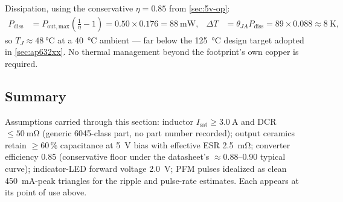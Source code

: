 Dissipation, using the conservative $\eta = 0.85$ from \cref{sec:5v-op}:
\begin{align*}
  P_{\mathrm{diss}} &= P_{\mathrm{out,max}}\left(\frac{1}{\eta}-1\right)
    = 0.50 \times 0.176 = \SI{88}{\milli\watt}, &
  \Delta T &= \theta_{JA} P_{\mathrm{diss}} = 89 \times 0.088 \approx \SI{8}{\kelvin},
\end{align*}
so $T_J \approx \SI{48}{\celsius}$ at a \SI{40}{\celsius} ambient --- far below the
\SI{125}{\celsius} design target adopted in \cref{sec:ap632xx}. No thermal management
beyond the footprint's own copper is required.

\subsection{Summary}\label{sec:5v-summary}

Assumptions carried through this section: inductor $I_{\mathrm{sat}} \geq \SI{3.0}{\ampere}$
and DCR $\leq \SI{50}{\milli\ohm}$ (generic 6045-class part, no part number recorded);
output ceramics retain $\geq 60\,\%$ capacitance at 5~V bias with effective ESR
\SI{2.5}{\milli\ohm}; converter efficiency 0.85 (conservative floor under the datasheet's
$\approx$0.88--0.90 typical curve); indicator-LED forward voltage \SI{2.0}{\volt};
PFM pulses idealized as clean
\SI{450}{\milli\ampere}-peak triangles for the ripple and pulse-rate estimates. Each
appears at its point of use above.

